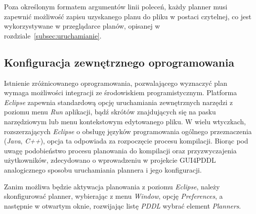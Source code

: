 Poza określonym formatem argumentów linii poleceń, każdy planner musi zapewnić możliwość zapisu uzyskanego planu do pliku w postaci czytelnej, co jest wykorzystywane w przeglądarce planów, opisanej w rozdziale~\ref{subsec:uruchamianie}.

\subsection{Konfiguracja zewnętrznego oprogramowania}
\label{subsec:konfiguracja}
Istnienie zróżnicowanego oprogramowania, pozwalającego wyznaczyć plan wymaga możliwości integracji ze środowiskiem programistycznym. Platforma \textit{Eclipse} zapewnia standardową opcję uruchamiania zewnętrznych narzędzi z poziomu menu \textit{Run} aplikacji, bądź skrótów znajdujących się na pasku narzędziowym lub menu kontekstowym edytowanego pliku. W wielu wtyczkach, rozszerzających \textit{Eclipse} o obsługę języków programowania ogólnego przeznaczenia (\textit{Java}, \textit{C++}), opcja ta odpowiada za rozpoczęcie procesu kompilacji. Biorąc pod uwagę podobieństwo procesu planowania do kompilacji oraz przyzwyczajenia użytkowników, zdecydowano o wprowadzeniu w projekcie GUI4PDDL analogicznego sposobu uruchamiania plannera i jego konfiguracji.

Zanim możliwa będzie aktywacja planowania z poziomu \textit{Eclipse}, należy skonfigurować planner, wybierając z menu \textit{Window}, opcję \textit{Preferences}, a następnie w otwartym oknie, rozwijając listę \textit{PDDL} wybrać element \textit{Planners}.

